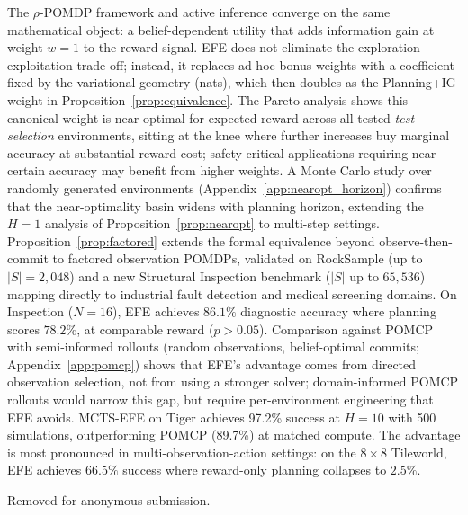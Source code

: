 \documentclass{article}
\begin{document}
The $\rho$-POMDP framework and active inference converge on the same mathematical object: a belief-dependent utility that adds information gain at weight $w{=}1$ to the reward signal. EFE does not eliminate the exploration--exploitation trade-off; instead, it replaces ad hoc bonus weights with a coefficient fixed by the variational geometry (nats), which then doubles as the Planning+IG weight in Proposition~\ref{prop:equivalence}. The Pareto analysis shows this canonical weight is near-optimal for expected reward across all tested \emph{test-selection} environments, sitting at the knee where further increases buy marginal accuracy at substantial reward cost; safety-critical applications requiring near-certain accuracy may benefit from higher weights. A Monte Carlo study over randomly generated environments (Appendix~\ref{app:nearopt_horizon}) confirms that the near-optimality basin widens with planning horizon, extending the $H{=}1$ analysis of Proposition~\ref{prop:nearopt} to multi-step settings. Proposition~\ref{prop:factored} extends the formal equivalence beyond observe-then-commit to factored observation POMDPs, validated on RockSample (up to $|S|{=}2{,}048$) and a new Structural Inspection benchmark ($|S|$ up to $65{,}536$) mapping directly to industrial fault detection and medical screening domains. On Inspection ($N{=}16$), EFE achieves $86.1\%$ diagnostic accuracy where planning scores $78.2\%$, at comparable reward ($p > 0.05$). Comparison against POMCP with semi-informed rollouts (random observations, belief-optimal commits; Appendix~\ref{app:pomcp}) shows that EFE's advantage comes from directed observation selection, not from using a stronger solver; domain-informed POMCP rollouts would narrow this gap, but require per-environment engineering that EFE avoids. MCTS-EFE on Tiger achieves 97.2\% success at $H{=}10$ with 500 simulations, outperforming POMCP (89.7\%) at matched compute. The advantage is most pronounced in multi-observation-action settings: on the $8{\times}8$ Tileworld, EFE achieves $66.5\%$ success where reward-only planning collapses to $2.5\%$.

\begin{ack}
Removed for anonymous submission.
\end{ack}
\end{document}
